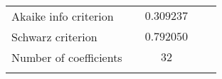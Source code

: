 \begin{tabular}{lrrrr}
\multicolumn{1}{l}{Akaike info criterion}&\multicolumn{1}{c}{}&\multicolumn{1}{c}{$0.309237$}&\multicolumn{1}{c}{}&\multicolumn{1}{c}{}\\
\multicolumn{1}{l}{Schwarz criterion}&\multicolumn{1}{c}{}&\multicolumn{1}{c}{$0.792050$}&\multicolumn{1}{c}{}&\multicolumn{1}{c}{}\\
\multicolumn{1}{l}{Number of coefficients}&\multicolumn{1}{c}{}&\multicolumn{1}{c}{$32$}&\multicolumn{1}{c}{}&\multicolumn{1}{c}{}\\
[4.5pt] \hline \\ [-4.5pt]
\end{tabular}
